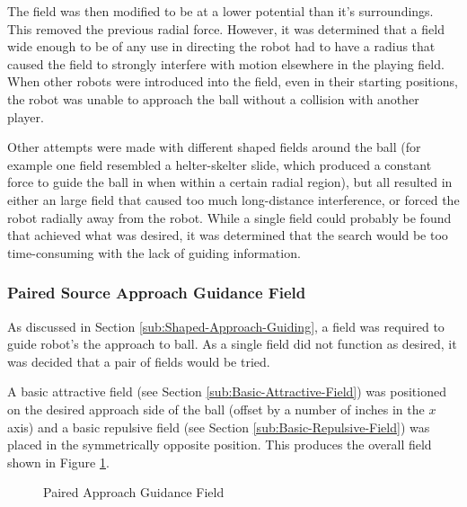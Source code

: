 \documentclass[10pt]{article}
\begin{document}
The field was then modified to be at a lower potential than it's surroundings.
This removed the previous radial force. However, it was determined that a field
wide enough to be of any use in directing the robot had to have a radius that
caused the field to strongly interfere with motion elsewhere in the playing
field. When other robots were introduced into the field, even in their starting
positions, the robot was unable to approach the ball without a collision with
another player.

Other attempts were made with different shaped fields around the ball (for
example one field resembled a helter-skelter slide, which produced a constant
force to guide the ball in when within a certain radial region), but all
resulted in either an large field that caused too much long-distance
interference, or forced the robot radially away from the robot. While a single
field could probably be found that achieved what was desired, it was determined
that the search would be too time-consuming with the lack of guiding
information.

\subsubsection{Paired Source Approach Guidance Field\label{sub:paired-field}}

As discussed in Section \ref{sub:Shaped-Approach-Guiding}, a field was required
to guide robot's the approach to ball. As a single field did not function as
desired, it was decided that a pair of fields would be tried.

A basic attractive field (see Section \ref{sub:Basic-Attractive-Field}) was
positioned on the desired approach side of the ball (offset by a number of
inches in the $x$ axis) and a basic repulsive field (see Section
\ref{sub:Basic-Repulsive-Field}) was placed in the symmetrically opposite
position. This produces the overall field shown in Figure
\ref{fig:pairedApproachField}.

\begin{figure}
 \centering
 \caption{Paired Approach Guidance Field}
 \label{fig:pairedApproachField}
\end{figure}
\end{document}
